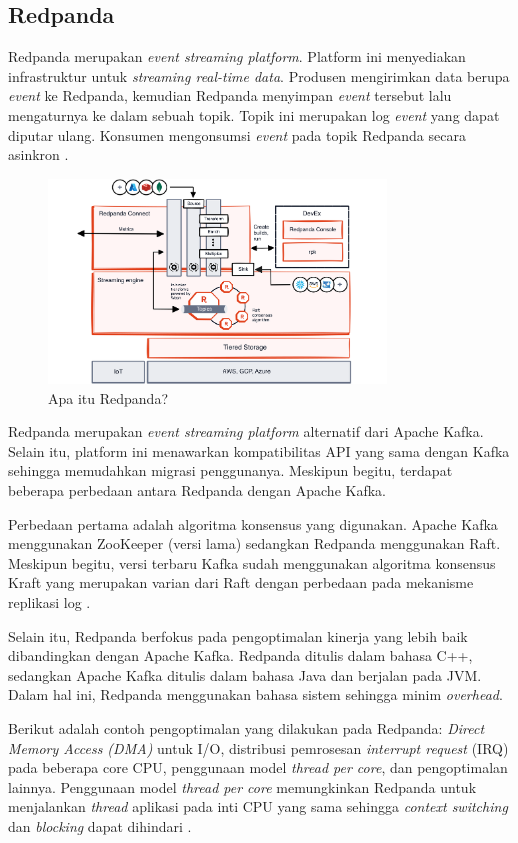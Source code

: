 \subsection{Redpanda}

Redpanda merupakan \textit{event streaming platform}. Platform ini menyediakan infrastruktur untuk \textit{streaming real-time data}. Produsen mengirimkan data berupa \textit{event} ke Redpanda, kemudian Redpanda menyimpan \textit{event} tersebut lalu mengaturnya ke dalam sebuah topik. Topik ini merupakan log \textit{event} yang dapat diputar ulang. Konsumen mengonsumsi \textit{event} pada topik Redpanda secara asinkron \parencite{redpandaIntro}.

\begin{figure}[ht]
    \centering
    \includegraphics[width=0.8\textwidth]{resources/chapter-2/redpanda.png}
    \caption{Apa itu Redpanda? \parencite{whatIsRedpanda}}
    \label{fig:what-is-redpanda}
\end{figure}

Redpanda merupakan \textit{event streaming platform} alternatif dari Apache Kafka. Selain itu, platform ini menawarkan kompatibilitas API yang sama dengan Kafka sehingga memudahkan migrasi penggunanya. Meskipun begitu, terdapat beberapa perbedaan antara Redpanda dengan Apache Kafka.

Perbedaan pertama adalah algoritma konsensus yang digunakan. Apache Kafka menggunakan ZooKeeper (versi lama) sedangkan Redpanda menggunakan Raft. Meskipun begitu, versi terbaru Kafka sudah menggunakan algoritma konsensus Kraft yang merupakan varian dari Raft dengan perbedaan pada mekanisme replikasi log \parencite{raftKraft}.

Selain itu, Redpanda berfokus pada pengoptimalan kinerja yang lebih baik dibandingkan dengan Apache Kafka. Redpanda ditulis dalam bahasa C++, sedangkan Apache Kafka ditulis dalam bahasa Java dan berjalan pada JVM. Dalam hal ini, Redpanda menggunakan bahasa sistem sehingga minim \textit{overhead}.

Berikut adalah contoh pengoptimalan yang dilakukan pada Redpanda: \textit{Direct Memory Access (DMA)} untuk I/O, distribusi pemrosesan \textit{interrupt request} (IRQ) pada beberapa core CPU, penggunaan model \textit{thread per core}, dan pengoptimalan lainnya. Penggunaan model \textit{thread per core} memungkinkan Redpanda untuk menjalankan \textit{thread} aplikasi pada inti CPU yang sama sehingga \textit{context switching} dan \textit{blocking} dapat dihindari \parencite{redpandaArchitecture}.